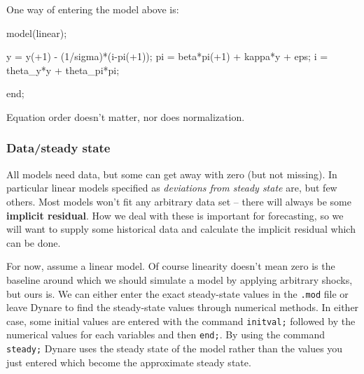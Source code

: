 \documentclass[
  letterpaper,
]{book}
\newenvironment{Shaded}{\begin{snugshade}}{\end{snugshade}}
\newcommand{\FloatTok}[1]{\textcolor[rgb]{0.68,0.00,0.00}{#1}}
\newcommand{\KeywordTok}[1]{\textcolor[rgb]{0.00,0.23,0.31}{#1}}
\newcommand{\NormalTok}[1]{\textcolor[rgb]{0.00,0.23,0.31}{#1}}
\newcommand{\OperatorTok}[1]{\textcolor[rgb]{0.37,0.37,0.37}{#1}}
\newcommand{\VariableTok}[1]{\textcolor[rgb]{0.07,0.07,0.07}{#1}}
\begin{document}
One way of entering the model above is:

\begin{Shaded}
\begin{Highlighting}[]
\VariableTok{model}\NormalTok{(}\VariableTok{linear}\NormalTok{)}\OperatorTok{;}

    \VariableTok{y} \OperatorTok{=} \VariableTok{y}\NormalTok{(}\OperatorTok{+}\FloatTok{1}\NormalTok{) }\OperatorTok{{-}}\NormalTok{ (}\FloatTok{1}\OperatorTok{/}\VariableTok{sigma}\NormalTok{)}\OperatorTok{*}\NormalTok{(}\VariableTok{i}\OperatorTok{{-}}\VariableTok{pi}\NormalTok{(}\OperatorTok{+}\FloatTok{1}\NormalTok{))}\OperatorTok{;}
    \VariableTok{pi} \OperatorTok{=} \VariableTok{beta}\OperatorTok{*}\VariableTok{pi}\NormalTok{(}\OperatorTok{+}\FloatTok{1}\NormalTok{) }\OperatorTok{+} \VariableTok{kappa}\OperatorTok{*}\VariableTok{y} \OperatorTok{+} \VariableTok{eps}\OperatorTok{;}
    \VariableTok{i} \OperatorTok{=} \VariableTok{theta\_y}\OperatorTok{*}\VariableTok{y} \OperatorTok{+} \VariableTok{theta\_pi}\OperatorTok{*}\VariableTok{pi}\OperatorTok{;}

\KeywordTok{end}\OperatorTok{;}
\end{Highlighting}
\end{Shaded}

Equation order doesn't matter, nor does normalization.

\hypertarget{datasteady-state}{%
\subsubsection{Data/steady state}\label{datasteady-state}}

All models need data, but some can get away with zero (but not missing).
In particular linear models specified as \emph{deviations from steady
state} are, but few others. Most models won't fit any arbitrary data set
-- there will always be some \textbf{implicit residual}. How we deal
with these is important for forecasting, so we will want to supply some
historical data and calculate the implicit residual which can be done.

For now, assume a linear model. Of course linearity doesn't mean zero is
the baseline around which we should simulate a model by applying
arbitrary shocks, but ours is. We can either enter the exact
steady-state values in the \texttt{.mod} file or leave Dynare to find
the steady-state values through numerical methods. In either case, some
initial values are entered with the command \texttt{initval;} followed
by the numerical values for each variables and then \texttt{end;}. By
using the command \texttt{steady;} Dynare uses the steady state of the
model rather than the values you just entered which become the
approximate steady state.
\end{document}
